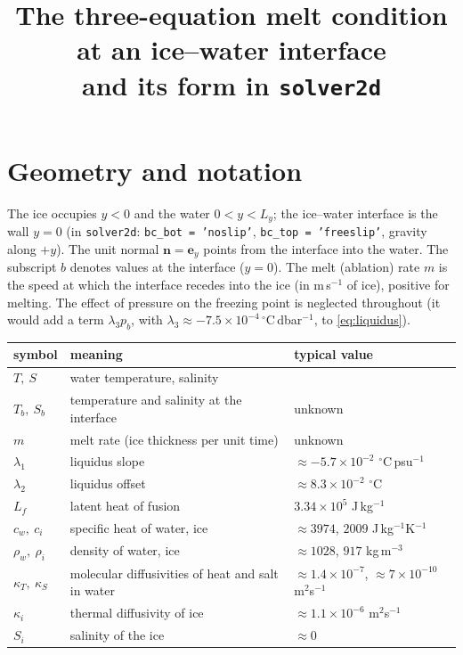 \documentclass[11pt,a4paper]{article}
\title{The three-equation melt condition at an ice--water interface\\[0.3em]
\large and its form in \texttt{solver2d}}
\date{}
\begin{document}
\maketitle

\section{Geometry and notation}

The ice occupies $y<0$ and the water $0<y<L_y$; the ice--water interface is the wall $y=0$ (in
\texttt{solver2d}: \texttt{bc\_bot = 'noslip'}, \texttt{bc\_top = 'freeslip'}, gravity along $+y$).
The unit normal $\mathbf{n}=\mathbf{e}_y$ points from the interface into the water. The subscript $b$
denotes values at the interface ($y=0$). The melt (ablation) rate $m$ is the speed at which the
interface recedes into the ice (in m\,s$^{-1}$ of ice), positive for melting. The effect of pressure
on the freezing point is neglected throughout (it would add a term $\lambda_3 p_b$, with
$\lambda_3\approx -7.5\times10^{-4}$\,$^\circ$C\,dbar$^{-1}$, to \eqref{eq:liquidus}).

\begin{center}
\begin{tabular}{lll}
\toprule
symbol & meaning & typical value \\
\midrule
$T,\ S$ & water temperature, salinity & \\
$T_b,\ S_b$ & temperature and salinity at the interface & unknown \\
$m$ & melt rate (ice thickness per unit time) & unknown \\
$\lambda_1$ & liquidus slope & $\approx -5.7\times10^{-2}$ $^\circ$C\,psu$^{-1}$ \\
$\lambda_2$ & liquidus offset & $\approx 8.3\times10^{-2}$ $^\circ$C \\
$L_f$ & latent heat of fusion & $3.34\times10^{5}$ J\,kg$^{-1}$ \\
$c_w,\ c_i$ & specific heat of water, ice & $\approx 3974$, $2009$ J\,kg$^{-1}$K$^{-1}$ \\
$\rho_w,\ \rho_i$ & density of water, ice & $\approx 1028$, $917$ kg\,m$^{-3}$ \\
$\kappa_T,\ \kappa_S$ & molecular diffusivities of heat and salt in water & $\approx 1.4\times10^{-7}$, $\approx 7\times10^{-10}$ m$^2$s$^{-1}$ \\
$\kappa_i$ & thermal diffusivity of ice & $\approx 1.1\times10^{-6}$ m$^2$s$^{-1}$ \\
$S_i$ & salinity of the ice & $\approx 0$ \\
\bottomrule
\end{tabular}
\end{center}
\end{document}
